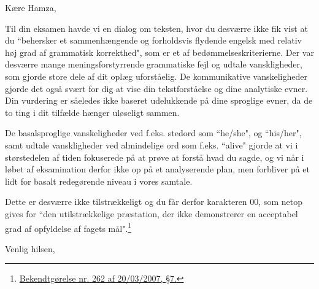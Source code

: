 \documentclass[11pt,a4paper]{letter}
\date{\vest\today}
\newcommand{\qm}[1]{``#1"}
\let\letterclassopening\opening
\renewcommand{\opening}[1]{\letterclassopening{#1}\vspace{2em}}
\renewcommand{\closing}[1]{\par\vspace{2em}\noindent #1\par\vspace{1em}\noindent\fromsig\par}
\begin{document}
\begin{letter}{}
\opening{Kære Hamza,}

Til din eksamen havde vi en dialog om teksten, hvor du desværre ikke fik vist at du \qm{behersker et sammenhængende og forholdsvis flydende engelsk med relativ høj grad af grammatisk korrekthed}, som er et af bedømmelseskriterierne. Der var desværre mange meningsforstyrrende grammatiske fejl og udtale vanskligheder, som gjorde store dele af dit oplæg uforståelig. De kommunikative vanskeligheder gjorde det også svært for dig at vise din tekstforståelse og dine analytiske evner. Din vurdering er såeledes ikke baseret udelukkende på dine sproglige evner, da de to ting i dit tilfælde hænger uløseligt sammen.

De basalsproglige vanskeligheder ved f.eks. stedord som \qm{he/she}, og \qm{his/her}, samt udtale vanskligheder ved almindelige ord som f.eks. \qm{alive} gjorde at vi i størstedelen af tiden fokuserede på at prøve at forstå hvad du sagde, og vi når i løbet af eksamination derfor ikke op på et analyserende plan, men forbliver på et lidt for basalt redegørende niveau i vores samtale.

Dette er desværre ikke tilstrækkeligt og du får derfor karakteren 00, som netop gives for \qm{den utilstrækkelige præstation, der ikke demonstrerer en acceptabel grad af opfyldelse af fagets mål}.\footnote{\href{https://www.retsinformation.dk/eli/lta/2007/262}{Bekendtgørelse nr. 262 af 20/03/2007, \S 7.}}
 
\closing{Venlig hilsen,}

\end{letter}
\end{document}
